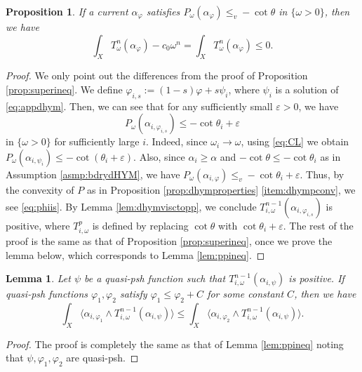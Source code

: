 \documentclass[10pt,a4paper]{amsart}
\numberwithin{equation}{section}
\newtheorem{prop}[equation]{Proposition}
\newtheorem{lem}[equation]{Lemma}
\begin{document}
\begin{prop}\label{prop:dhymsuperineq}
    If a current $\alpha_\varphi$ satisfies $P_\omega(\alpha_\varphi)\le_v-\cot\theta$ in $\{\omega>0\}$, then we have
    $$\int_XT^n_\omega(\alpha_\varphi)-c_0\omega^n=\int_XT^n_\omega(\alpha_\varphi)\le0.$$
\end{prop}

\begin{proof}
    We only point out the differences from the proof of Proposition \ref{prop:superineq}. We define $\varphi_{i,s}:=(1-s)\varphi+s\psi_i$, where $\psi_i$ is a solution of \eqref{eq:appdhym}. Then, we can see that for any sufficiently small $\varepsilon>0$, we have \begin{equation}\label{eq:phiis}
        P_\omega(\alpha_{i,\varphi_{i,s}})\le-\cot\theta_i+\varepsilon
    \end{equation} in $\{\omega>0\}$ for sufficiently large $i$. Indeed, since $\omega_i\to\omega$, using \eqref{eq:CL} we obtain $P_\omega(\alpha_{i,\psi_i})\le-\cot(\theta_i+\varepsilon)$. Also, since $\alpha_i\ge\alpha$ and $-\cot\theta\le-\cot\theta_i$ as in Assumption \ref{asmp:bdrydHYM}, we have $P_\omega(\alpha_{i,\varphi})\le_v-\cot\theta_i+\varepsilon$. Thus, by the convexity of $P$ as in Proposition \ref{prop:dhymproperties} \ref{item:dhympconv}, we see \eqref{eq:phiis}. By Lemma \ref{lem:dhymvisctopp}, we conclude $T^{n-1}_{i,\omega}(\alpha_{i,\varphi_{i,s}})$ is positive, where $T^p_{i,\omega}$ is defined by replacing $\cot\theta$ with $\cot\theta_i+\varepsilon$.
    The rest of the proof is the same as that of Proposition \ref{prop:superineq}, once we prove the lemma below, which corresponds to Lemma \ref{lem:ppineq}.
\end{proof}

\begin{lem}
    Let $\psi$ be a quasi-psh function such that $T^{n-1}_{i,\omega}(\alpha_{i,\psi})$ is positive. If quasi-psh functions $\varphi_1,\varphi_2$ satisfy $\varphi_1\le\varphi_2+C$ for some constant $C$, then we have 
    $$\int_X\big\langle\alpha_{i,\varphi_1}\wedge T^{n-1}_{i,\omega}(\alpha_{i,\psi})\big\rangle\le\int_X\big\langle\alpha_{i,\varphi_2}\wedge T^{n-1}_{i,\omega}(\alpha_{i,\psi})\big\rangle.$$
\end{lem}

\begin{proof}
    The proof is completely the same as that of Lemma \ref{lem:ppineq} noting that $\psi,\varphi_1,\varphi_2$ are quasi-psh.
\end{proof}
\end{document}
